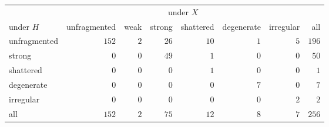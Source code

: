 \begin{tabular}{lrrrrrrr}
\hline
 & \multicolumn{6}{c}{under $X$} & \\
under $H$ & unfragmented & weak & strong & shattered & degenerate & irregular & all \\
\hline
unfragmented & $152$ & $2$ & $26$ & $10$ & $1$ & $5$ & $196$ \\
strong & $0$ & $0$ & $49$ & $1$ & $0$ & $0$ & $50$ \\
shattered & $0$ & $0$ & $0$ & $1$ & $0$ & $0$ & $1$ \\
degenerate & $0$ & $0$ & $0$ & $0$ & $7$ & $0$ & $7$ \\
irregular & $0$ & $0$ & $0$ & $0$ & $0$ & $2$ & $2$ \\
\hline
all & $152$ & $2$ & $75$ & $12$ & $8$ & $7$ & $256$ \\
\hline
\end{tabular}
